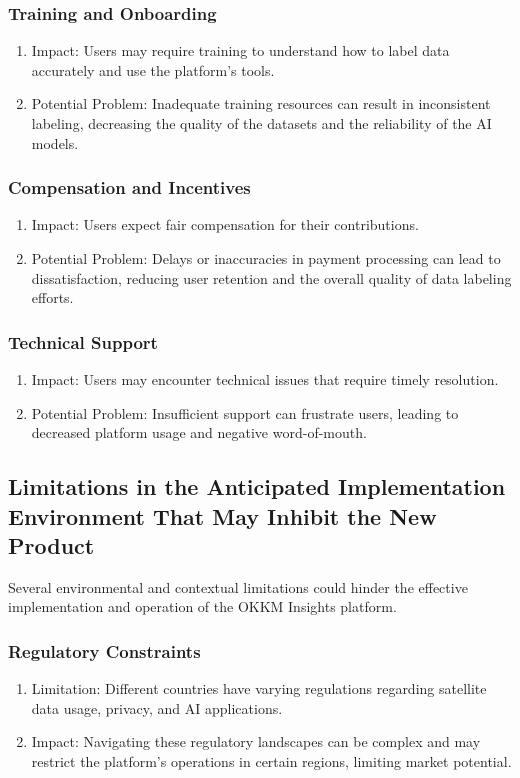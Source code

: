 \documentclass[12pt]{article}
\begin{document}
\subsubsection{Training and Onboarding}
\begin{enumerate}
    \item Impact: Users may require training to understand how to label data accurately and use the platform's tools.
    \item Potential Problem: Inadequate training resources can result in inconsistent labeling, decreasing the quality of the datasets and the reliability of the AI models.
\end{enumerate}
\subsubsection{Compensation and Incentives}
\begin{enumerate}
    \item Impact: Users expect fair compensation for their contributions.
    \item Potential Problem: Delays or inaccuracies in payment processing can lead to dissatisfaction, reducing user retention and the overall quality of data labeling efforts.
\end{enumerate}
\subsubsection{Technical Support}
\begin{enumerate}
    \item Impact: Users may encounter technical issues that require timely resolution.
    \item Potential Problem: Insufficient support can frustrate users, leading to decreased platform usage and negative word-of-mouth.
\end{enumerate}
\subsection{Limitations in the Anticipated Implementation Environment That May
Inhibit the New Product}
Several environmental and contextual limitations could hinder the effective implementation and operation of the OKKM Insights platform.
\subsubsection{Regulatory Constraints}
\begin{enumerate}
    \item Limitation: Different countries have varying regulations regarding satellite data usage, privacy, and AI applications.
    \item Impact: Navigating these regulatory landscapes can be complex and may restrict the platform's operations in certain regions, limiting market potential.
\end{enumerate}
\end{document}
